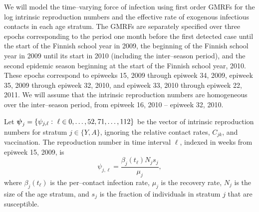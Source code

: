 We will model the time--varying force of infection using first order GMRFs for the log intrinsic reproduction numbers and the effective rate of exogenous infectious contacts in each age stratum. The GMRFs are separately specified over three epochs corresponding to the period one month before the first detected case until the start of the Finnish school year in 2009, the beginning of the Finnish school year in 2009 until its start in 2010 (including the inter--season period), and the second epidemic season beginning at the start of the Finnish school year, 2010. These epochs correspond to epiweeks 15, 2009 through epiweek 34, 2009, epiweek 35, 2009 through epiweek 32, 2010, and epiweek 33, 2010 through epiweek 22, 2011. We will assume that the intrinsic reproduction numbers are homogeneous over the inter--season period, from epiweek 16, 2010 -- epiweek 32, 2010.

Let $ \bpsi_{j} = \lbrace\psi_{j,\ell}:\ \ell \in 0,\dots,52,71,\dots,112\rbrace $ be the vector of intrinsic reproduction numbers for stratum $ j \in \lbrace Y,A \rbrace$, ignoring the relative contact rates, $ C_{jk} $, and vaccination. The reproduction number in time interval $ \ell $, indexed in weeks from epiweek 15, 2009, is
\begin{equation}
\label{eqn:R0t_novacc}
\psi_{j,\ell} = \frac{\beta_j(t_\ell)N_js_j}{\mu_j},
\end{equation}
where $ \beta_j(t_\ell) $ is the per--contact infection rate, $ \mu_j $ is the recovery rate, $ N_j $ is the size of the age stratum, and $ s_j $ is the fraction of individuals in stratum $ j $ that are susceptible.
 
